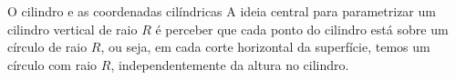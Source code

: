 \begin{example}{O cilindro e as coordenadas cilíndricas}{}
A ideia central para parametrizar um cilindro vertical de raio \(R\) é perceber que cada ponto do cilindro está sobre um círculo de raio $R$, ou seja, em cada corte horizontal da superfície, temos um círculo com raio \(R\), independentemente da altura no cilindro. 


\begin{center}
    
\begin{comment}\begin{tikzpicture}[tdplot_main_coords,scale=2]


\draw[red!140] plot[domain=-0.85*pi/2:-3*pi/2,smooth,variable=\t] ({cos(\t r)},{sin(\t r)},{sqrt(2)/2}); 

  \pgfmathsetmacro{\tini}{0.5*pi}
		\pgfmathsetmacro{\tfin}{1.85*pi}
		\pgfmathsetmacro{\tend}{2.5*pi}
		\draw[-latex] (0,0,0) -- (2.5,0,0) node [below left] {$x$};
		\draw[dashed] (0,0,0) -- (-1.25,0,0);
		\draw[-latex] (0,0,0) -- (0,2,0) node [right] {$y$};
		\draw[dashed] (0,0,0) -- (0,-1.25,0);
		\foreach \altura in {0,0.0125,0.025,...,1.5}{
			\pgfmathparse{1}
			\pgfmathsetmacro{\radio}{\pgfmathresult}
			\draw[blue!50,opacity=0.5] plot[domain=\tini:\tfin,smooth,variable=\t] ({\radio*cos(\t r)},{\radio*sin(\t r)},{\altura}); 
		}
  
  
  
		\draw[-latex] (0,0,0) -- (0,0,2) node [above] {$z$};



\end{comment}
\end{center}
\end{example}
